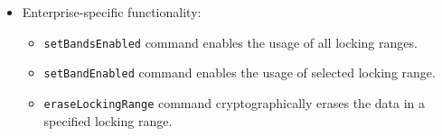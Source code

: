 \begin{itemize}
    \item Enterprise-specific functionality: \begin{itemize}
\item \verb|setBandsEnabled| command enables the usage of all locking ranges.
\item \verb|setBandEnabled| command enables the usage of selected locking range.
\item \verb|eraseLockingRange| command cryptographically erases the data in a specified locking range.
    \end{itemize}
\end{itemize}






